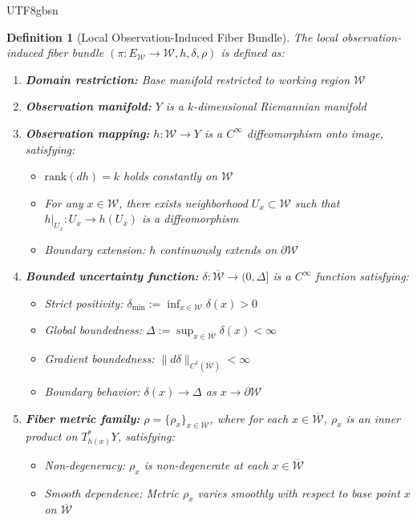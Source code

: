 \documentclass[a4paper,12pt]{extarticle}
\newtheorem{definition}{Definition}
\theoremstyle{definition}
\begin{document}
\begin{CJK}{UTF8}{gbsn}
\begin{definition}[Local Observation-Induced Fiber Bundle]
The local observation-induced fiber bundle $(\pi: E_{\mathcal{W}} \to \mathcal{W}, h, \delta, \rho)$ is defined as:
\begin{enumerate}[label=(\arabic*)]
\item \textbf{Domain restriction:} Base manifold restricted to working region $\mathcal{W}$
\item \textbf{Observation manifold:} $Y$ is a $k$-dimensional Riemannian manifold
\item \textbf{Observation mapping:} $h: \mathcal{W} \to Y$ is a $C^\infty$ diffeomorphism onto image, satisfying:
   \begin{itemize}
   \item $\text{rank}(dh) = k$ holds constantly on $\mathcal{W}$
   \item For any $x \in \mathcal{W}$, there exists neighborhood $U_x \subset \mathcal{W}$ such that $h|_{U_x}: U_x \to h(U_x)$ is a diffeomorphism
   \item Boundary extension: $h$ continuously extends on $\partial \mathcal{W}$
   \end{itemize}
\item \textbf{Bounded uncertainty function:} $\delta: \overline{\mathcal{W}} \to (0, \Delta]$ is a $C^\infty$ function satisfying:
   \begin{itemize}
   \item Strict positivity: $\delta_{\min} := \inf_{x \in \mathcal{W}} \delta(x) > 0$
   \item Global boundedness: $\Delta := \sup_{x \in \overline{\mathcal{W}}} \delta(x) < \infty$
   \item Gradient boundedness: $\|d\delta\|_{C^1(\overline{\mathcal{W}})} < \infty$
   \item Boundary behavior: $\delta(x) \to \Delta$ as $x \to \partial \mathcal{W}$
   \end{itemize}
\item \textbf{Fiber metric family:} $\rho = \{\rho_x\}_{x \in \overline{\mathcal{W}}}$, where for each $x \in \overline{\mathcal{W}}$, $\rho_x$ is an inner product on $T^*_{h(x)}Y$, satisfying:
   \begin{itemize}
   \item Non-degeneracy: $\rho_x$ is non-degenerate at each $x \in \overline{\mathcal{W}}$
   \item Smooth dependence: Metric $\rho_x$ varies smoothly with respect to base point $x$ on $\overline{\mathcal{W}}$

\end{itemize}
\end{enumerate}
\end{definition}
\end{CJK}
\end{document}
